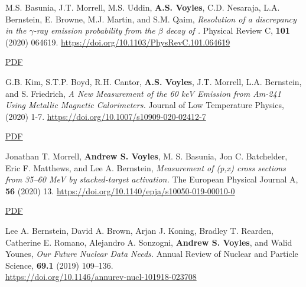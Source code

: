 \begin{bibsection}
\item M.S. Basunia, J.T. Morrell, M.S. Uddin, \textbf{A.S. Voyles}, C.D. Nesaraja, L.A. Bernstein, E. Browne, M.J. Martin, and S.M. Qaim, \emph{Resolution of a discrepancy in the $\gamma$-ray emission probability from the $\beta$ decay of .} Physical Review C, \textbf{101} (2020) 064619. \url{https://doi.org/10.1103/PhysRevC.101.064619} 

\ifshort \vspace{0.1cm} \href{https://avoyles.github.io/papers/Basunia2020_BR.pdf}{\underline{PDF}} \else  \fi 





\item G.B. Kim, S.T.P. Boyd, R.H. Cantor, \textbf{A.S. Voyles}, J.T. Morrell, L.A. Bernstein, and S. Friedrich, \emph{A New Measurement of the 60 keV Emission from Am-241 Using Metallic Magnetic Calorimeters.} Journal of Low Temperature Physics,  (2020) 1-7. \url{https://doi.org/10.1007/s10909-020-02412-7} 

\ifshort \vspace{0.1cm} \href{https://avoyles.github.io/papers/Kim2020_Calorimeter.pdf}{\underline{PDF}} \else  \fi 




\item Jonathan T. Morrell, \textbf{Andrew S. Voyles}, M. S. Basunia, Jon C. Batchelder, Eric F. Matthews, and Lee A. Bernstein, \emph{Measurement of (p,x) cross sections from 35--60 MeV by stacked-target activation.} The European Physical Journal A, \textbf{56} (2020) 13. \url{https://doi.org/10.1140/epja/s10050-019-00010-0} 

\ifshort \vspace{0.1cm} \href{https://avoyles.github.io/papers/Morrell2020_LaCe.pdf}{\underline{PDF}} \else  \fi 


\item Lee A. Bernstein,  David A. Brown,  Arjan J. Koning, Bradley T. Rearden,  Catherine E. Romano, Alejandro A. Sonzogni,  \textbf{Andrew S. Voyles}, and Walid Younes, \emph{Our Future Nuclear Data Needs.} Annual Review of Nuclear and Particle Science, \textbf{69.1} (2019) 109--136.
\\ \url{https://doi.org/10.1146/annurev-nucl-101918-023708}



\end{bibsection}
